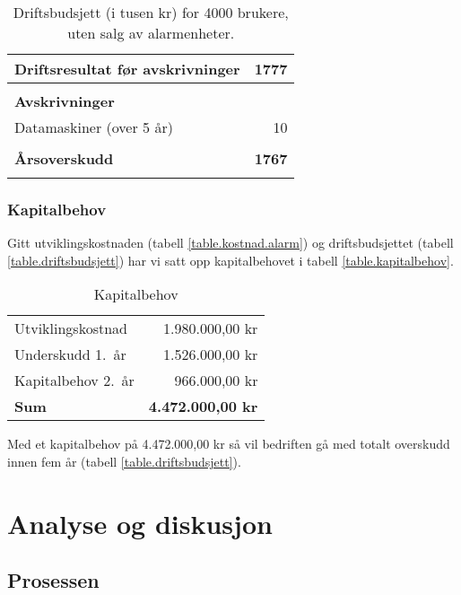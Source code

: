 \begin{table}
\begin{tabular}{lr}
    \\
    \textbf{Driftsresultat før avskrivninger}         &  \textbf{1777} \\
    \hline
    \\
    \textbf{Avskrivninger}                            & \\
    Datamaskiner (over 5 år)                          &    10 \\
    \\
    \textbf{Årsoverskudd}                             &  \textbf{1767} \\
    \thickhline
    \\
  \end{tabular}
  \caption{Driftsbudsjett (i tusen kr) for 4000 brukere, uten salg av alarmenheter.}
  \label{table.drift}
\end{table}


\subsection{Kapitalbehov}

Gitt utviklingskostnaden (tabell \vref{table.kostnad.alarm}) og
driftsbudsjettet (tabell \vref{table.driftsbudsjett}) har vi satt opp
kapitalbehovet i tabell \vref{table.kapitalbehov}.

\begin{table}
  \centering
  \begin{tabular}{lr}
    Utviklingskostnad   & 1.980.000,00 kr \\
    Underskudd 1.~år    & 1.526.000,00 kr \\
    Kapitalbehov 2.~år  &   966.000,00 kr \\
   \textbf{Sum} & \textbf{4.472.000,00 kr} \\
  \end{tabular}
  \caption{Kapitalbehov}
  \label{table.kapitalbehov}
\end{table}

Med et kapitalbehov på 4.472.000,00 kr så vil bedriften gå med totalt overskudd
innen fem år (tabell \vref{table.driftsbudsjett}).

\chapter{Analyse og diskusjon}

\section{Prosessen}
\label{prosessen}

